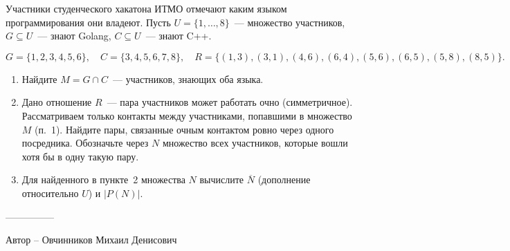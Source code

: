 \question
Участники студенческого хакатона ИТМО отмечают каким языком
программирования они владеют. Пусть $U = \{1, \ldots, 8\}$~---
множество участников, $G \subseteq U$~--- знают Golang,
$C \subseteq U$~--- знают C++.

\[
    G = \{1, 2, 3, 4, 5, 6\}, \quad
    C = \{3, 4, 5, 6, 7, 8\}, \quad
    R = \{(1, 3), (3, 1), (4, 6), (6, 4), (5, 6), (6, 5), (5, 8), (8, 5)\}.
\]

\begin{enumerate}
    \renewcommand{\labelenumi}{\arabic{enumi}.}
    \item Найдите $M = G \cap C$~--- участников, знающих оба языка.

    \item Дано отношение $R$~--- пара участников может работать очно
    (симметричное). Рассматриваем только контакты между участниками,
    попавшими в множество $M$ (п.~1). Найдите пары, связанные очным
    контактом ровно через одного посредника. Обозначьте через $N$
    множество всех участников, которые вошли хотя бы в одну такую пару.

    \item Для найденного в пункте~2 множества $N$ вычислите
    $\overline{N}$ (дополнение относительно $U$) и $|P(N)|$.
\end{enumerate}

---------------

Автор -- Овчинников Михаил Денисович
